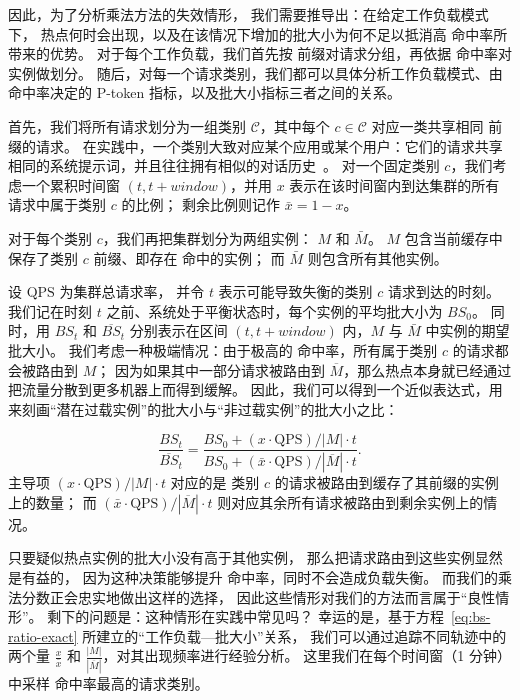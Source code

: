 因此，为了分析乘法方法的失效情形，
我们需要推导出：在给定工作负载模式下，{\kvcache} 热点何时会出现，以及在该情况下增加的批大小为何不足以抵消高 {\kvcache} 命中率所带来的优势。
对于每个工作负载，我们首先按 {\kvcache} 前缀对请求分组，再依据 {\kvcache} 命中率对实例做划分。
随后，对每一个请求类别，我们都可以具体分析工作负载模式、由 {\kvcache} 命中率决定的 P-token 指标，以及批大小指标三者之间的关系。

首先，我们将所有请求划分为一组类别
\(\mathcal{C}\)，其中每个 \(c\!\in\!\mathcal{C}\) 对应一类共享相同 {\kvcache} 前缀的请求。
在实践中，一个类别大致对应某个应用或某个用户：它们的请求共享相同的系统提示词，并且往往拥有相似的对话历史~\cite{10.5555/3768039.3768067}。
对一个固定类别 \(c\)，我们考虑一个累积时间窗
\((t, t+\textit{window})\)，并用 \(x\) 表示在该时间窗内到达集群的所有请求中属于类别 \(c\) 的比例；
剩余比例则记作 \(\bar{x} = 1-x\)。

对于每个类别 \(c\)，我们再把集群划分为两组实例：
\(M\) 和 \(\bar{M}\)。
\(M\) 包含当前缓存中保存了类别 \(c\) 前缀、即存在 {\kvcache} 命中的实例；
而 \(\bar{M}\) 则包含所有其他实例。

设 \(\text{QPS}\) 为集群总请求率，
并令 \(t\) 表示可能导致失衡的类别 \(c\) 请求到达的时刻。
我们记在时刻 \(t\) 之前、系统处于平衡状态时，每个实例的平均批大小为 \(BS_0\)。
同时，用 \(BS_{t}\) 和 \(\overline{BS}_{t}\) 分别表示在区间 \((t, t+\textit{window})\) 内，\(M\) 与 \(\bar{M}\) 中实例的期望批大小。
我们考虑一种极端情况：由于极高的 {\kvcache} 命中率，所有属于类别 \(c\) 的请求都会被路由到 \(M\)；
因为如果其中一部分请求被路由到 \(\overline{M}\)，那么热点本身就已经通过把流量分散到更多机器上而得到缓解。
因此，我们可以得到一个近似表达式，用来刻画“潜在过载实例”的批大小与“非过载实例”的批大小之比：

\begin{equation}
\frac{BS_{t}}{\overline{BS}_{t}}
  = \frac{
      BS_0 + \left( x \cdot \text{QPS}\right) / |M| \cdot t
    }{
      BS_0 + \left( \bar{x} \cdot \text{QPS}\right) / |\overline{M}| \cdot t
    }.
\label{eq:bs-ratio-exact}
\end{equation}
主导项
\(\left( x \cdot \text{QPS}\right) / |M| \cdot t\) 对应的是
类别 \(c\) 的请求被路由到缓存了其前缀的实例上的数量；
而 \(\left( \bar{x} \cdot \text{QPS}\right) / |\overline{M}| \cdot t\) 则对应其余所有请求被路由到剩余实例上的情况。

只要疑似热点实例的批大小没有高于其他实例，
那么把请求路由到这些实例显然是有益的，
因为这种决策能够提升 {\kvcache} 命中率，同时不会造成负载失衡。
而我们的乘法分数正会忠实地做出这样的选择，
因此这些情形对我们的方法而言属于“良性情形”。
剩下的问题是：这种情形在实践中常见吗？
幸运的是，基于方程~\ref{eq:bs-ratio-exact} 所建立的“工作负载—批大小”关系，
我们可以通过追踪不同轨迹中的两个量
\(\frac{x}{\bar{x}}\) 和 \(\frac{|M|}{|\overline{M}|}\)，对其出现频率进行经验分析。
这里我们在每个时间窗（1 分钟）中采样 {\kvcache} 命中率最高的请求类别。

